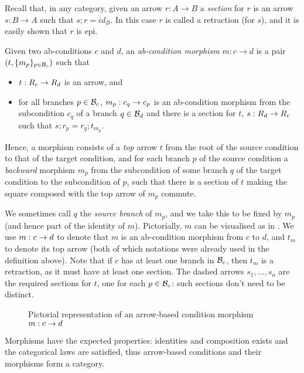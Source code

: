 Recall that, in any category, given an arrow $r: A \to B$ a \emph{section} for $r$ is an arrow $s: B \to A$ such that $s;r = id_B$. In this case $r$ is called a retraction (for $s$), and it is easily shown that $r$ is epi.

\begin{definition}
  Given two ab-conditions $c$ and $d$, an \emph{ab-condition morphism} $m: c \to d$
  is a pair $(t,\{{m_p}\}_{p\in \mathcal{B}_c})$ such that   
  \begin{itemize}
    \item $t:R_c\rightarrow R_d$ is an arrow, and 
  \item  for all branches $p\in \mathcal{B}_c$, $m_p:c_q\rightarrow c_p$ is an ab-condition morphism from the subcondition $c_q$ of a branch $q\in \mathcal{B}_d$ and there is a section for $t$, $s:R_d\rightarrow R_c$ such that $s; r_p = r_q;t_{m_p}$.
  \end{itemize}
\end{definition}
%
Hence, a morphism consists of a \emph{top} arrow $t$ from the root of the source condition to that of the target condition, and for each branch $p$ of the source condition a \emph{backward} morphism $m_p$ from the subcondition of some branch $q$ of the target condition to the subcondition of $p$, such that there is a section of $t$ making the square composed with the top arrow of $m_p$ commute. 

We sometimes call $q$ the \emph{source branch} of $m_p$, and we take this to be fixed by $m_p$ (and hence part of the identity of $m$). Pictorially, $m$ can be visualised as in . We use $m:c\rightarrow d$ to denote that $m$ is an ab-condition morphism from $c$ to $d$, and $t_m$ to denote its top arrow (both of which notations were already used in the definition above). Note that if $c$ has at least one branch in $\mathcal{B}_c$, then $t_m$ is a retraction, as it must have at least one section.  The dashed arrows $s_1, \ldots, s_n$ are the required sections for $t$, one for each $p\in \mathcal{B}_c$: such sections don't need to be distinct.  

%
\begin{figure}
  \centering
  
  \caption{Pictorial representation of an arrow-based condition morphism $m:c\rightarrow d$}
\end{figure}

\medskip\noindent Morphisms have the expected properties: identities and composition exists and the categorical laws are satisfied, thus arrow-based conditions and their morphisms form a category.
%

